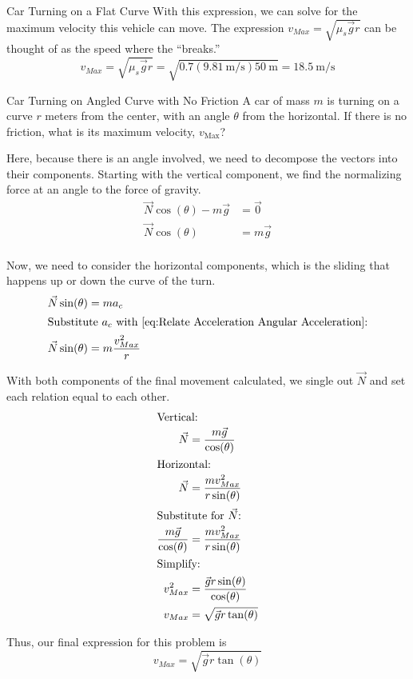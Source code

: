 \begin{example}[]{Car Turning on a Flat Curve}
  With this expression, we can solve for the maximum velocity this vehicle can move.
  The expression $v_{Max} = \sqrt{\mu_{s} \vec{g} r}$ can be thought of as the speed where the  ``breaks.''
  \begin{equation*}
    v_{Max} = \sqrt{\mu_{s} \vec{g} r} = \sqrt{0.7 (\SI{9.81}{\meter/\second}) \SI{50}{\meter}} = \SI{18.5}{\meter/\second}
  \end{equation*}
\end{example}

\begin{example}[]{Car Turning on Angled Curve with No Friction}
  A car of mass $m$ is turning on a curve $r$ meters from the center, with an angle $\theta$ from the horizontal.
  If there is no friction, what is its maximum velocity, $v_{\text{Max}}$?
  \tcblower{}

  Here, because there is an angle involved, we need to decompose the vectors into their components.
  Starting with the vertical component, we find the normalizing force at an angle to the force of gravity.
  \begin{align*}
    \vec{N} \cos(\theta) - m\vec{g} &= \vec{0} \\
    \vec{N} \cos(\theta) &= m\vec{g} \\
  \end{align*}

  Now, we need to consider the horizontal components, which is the sliding that happens up or down the curve of the turn.
  \begin{align*}
    \vec{N} \sin(\theta) &= m a_{c} \\
    \intertext{Substitute $a_{c}$ with \Cref{eq:Relate Acceleration Angular Acceleration}:}
    \vec{N} \sin(\theta) &= m \frac{v_{Max}^{2}}{r} \\
  \end{align*}

  With both components of the final movement calculated, we single out $\vec{N}$ and set each relation equal to each other.
  \begin{align*}
    \shortintertext{Vertical:}
    \vec{N} &= \frac{m\vec{g}}{\cos(\theta)} \\
    \shortintertext{Horizontal:}
    \vec{N} &= \frac{m v_{Max}^{2}}{r \sin(\theta)} \\
    \shortintertext{Substitute for $\vec{N}$:}
    \frac{m\vec{g}}{\cos(\theta)} &= \frac{m v_{Max}^{2}}{r \sin(\theta)} \\
    \shortintertext{Simplify:}
    v_{Max}^{2} &= \frac{\vec{g} r \sin(\theta)}{\cos(\theta)} \\
    v_{Max} &= \sqrt{\vec{g} r \tan(\theta)} \\
  \end{align*}

  Thus, our final expression for this problem is
  \begin{equation*}
    v_{Max} = \sqrt{\vec{g} r \tan(\theta)}
  \end{equation*}
\end{example}

